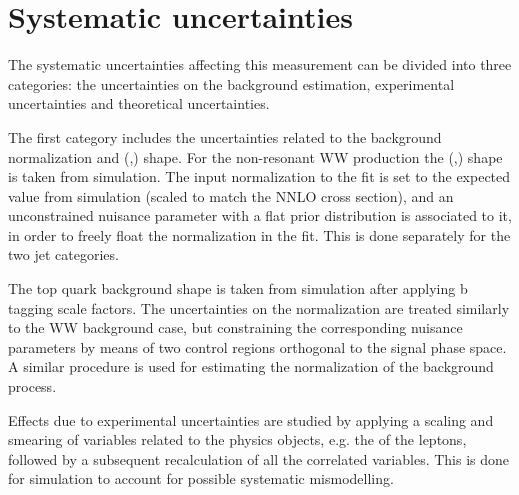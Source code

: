 \section{Systematic uncertainties}\label{chap5:systs}

The systematic uncertainties affecting this measurement can be divided into three categories: the uncertainties on the background estimation, experimental uncertainties and theoretical uncertainties.

The first category includes the uncertainties related to the background normalization and (\mll,\mt) shape. For the non-resonant WW production the (\mll,\mt) shape is taken from simulation. The input normalization to the fit is set to the expected value from simulation (scaled to match the NNLO cross section), and an unconstrained nuisance parameter with a flat prior distribution is associated to it, in order to freely float the normalization in the fit. This is done separately for the two jet categories.

The top quark background shape is taken from simulation after applying b tagging scale factors. The uncertainties on the normalization are treated similarly to the WW background case, but constraining the corresponding nuisance parameters by means of two control regions orthogonal to the signal phase space. A similar procedure is used for estimating the normalization of the \dytt background process.

Effects due to experimental uncertainties are studied by applying a scaling and smearing of variables related to the physics objects, e.g. the \pt of the leptons, followed by a subsequent recalculation of all the correlated variables. This is done for simulation to account for possible systematic mismodelling.


